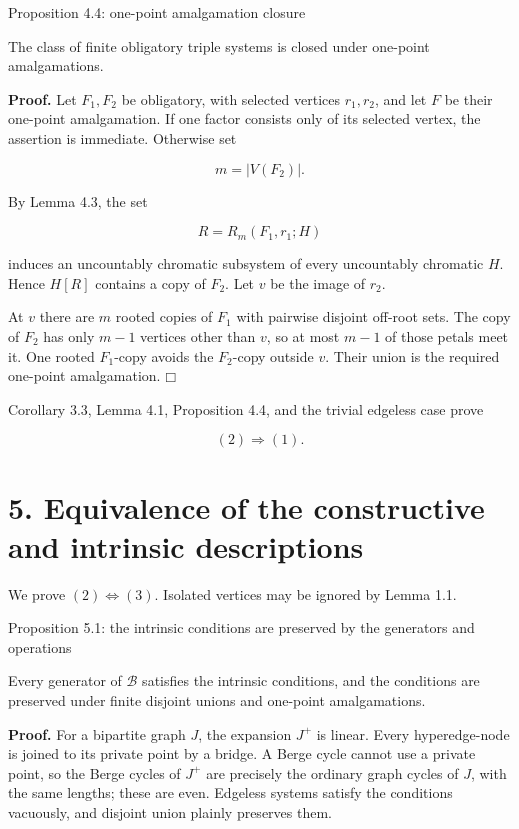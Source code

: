 \documentclass[11pt]{article}
\providecommand{\square}{\mdlgwhtsquare}
\begin{document}
\label{proposition-4.4-one-point-amalgamation-closure}
\begin{propositionbox}{Proposition 4.4: one-point amalgamation closure}

The class of finite obligatory triple systems is closed under one-point amalgamations.

\end{propositionbox}
\textbf{Proof.} Let \(F_1,F_2\) be obligatory, with selected vertices \(r_1,r_2\), and let \(F\) be their one-point amalgamation. If one factor consists only of its selected vertex, the assertion is immediate. Otherwise set

\[
m=|V(F_2)|.
\]

By Lemma 4.3, the set

\[
R=R_m(F_1,r_1;H)
\]

induces an uncountably chromatic subsystem of every uncountably chromatic \(H\). Hence \(H[R]\) contains a copy of \(F_2\). Let \(v\) be the image of \(r_2\).

At \(v\) there are \(m\) rooted copies of \(F_1\) with pairwise disjoint off-root sets. The copy of \(F_2\) has only \(m-1\) vertices other than \(v\), so at most \(m-1\) of those petals meet it. One rooted \(F_1\)-copy avoids the \(F_2\)-copy outside \(v\). Their union is the required one-point amalgamation. \(\square\)

Corollary 3.3, Lemma 4.1, Proposition 4.4, and the trivial edgeless case prove

\[
(2)\Longrightarrow(1). \tag{4.1}
\]

\section{5. Equivalence of the constructive and intrinsic descriptions}\label{equivalence-of-the-constructive-and-intrinsic-descriptions}

We prove \((2)\Longleftrightarrow(3)\). Isolated vertices may be ignored by Lemma 1.1.

\label{proposition-5.1-the-intrinsic-conditions-are-preserved-by-the-generators-and-operations}
\begin{propositionbox}{Proposition 5.1: the intrinsic conditions are preserved by the generators and operations}

Every generator of \(\mathcal B\) satisfies the intrinsic conditions, and the conditions are preserved under finite disjoint unions and one-point amalgamations.

\end{propositionbox}
\textbf{Proof.} For a bipartite graph \(J\), the expansion \(J^+\) is linear. Every hyperedge-node is joined to its private point by a bridge. A Berge cycle cannot use a private point, so the Berge cycles of \(J^+\) are precisely the ordinary graph cycles of \(J\), with the same lengths; these are even. Edgeless systems satisfy the conditions vacuously, and disjoint union plainly preserves them.
\end{document}

